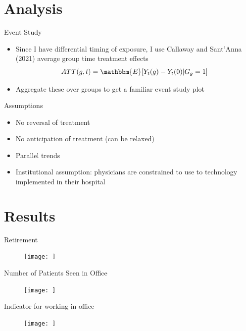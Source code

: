 \documentclass[10pt]{beamer}
\begin{document}
\section{Analysis}


\begin{frame}{Event Study}

\begin{itemize}
    \item Since I have differential timing of exposure, I use Callaway and Sant'Anna (2021) average group time treatment effects
    \vspace{3mm}
    $$ATT(g,t)=\mathbbm{E}[Y_t(g)-Y_t(0)|G_g=1]$$
    \vspace{3mm}
    \item Aggregate these over groups to get a familiar event study plot
\end{itemize}
    
\end{frame}

\begin{frame}{Assumptions}
\begin{itemize}
    \item No reversal of treatment
    \item No anticipation of treatment (can be relaxed)
    \item Parallel trends
    \item Institutional assumption: physicians are constrained to use to technology implemented in their hospital
\end{itemize}
    
\end{frame}

\section{Results}


\begin{frame}{Retirement}
\begin{figure}[ht]
    \centering
    \texttt{[image: ]}
\end{figure}
\end{frame}

\begin{frame}{Number of Patients Seen in Office}
\begin{figure}[ht]
    \centering
    \texttt{[image: ]}
\end{figure}
\end{frame}

\begin{frame}{Indicator for working in office}
\begin{figure}[ht]
    \centering
    \texttt{[image: ]}
\end{figure}
\end{frame}
\end{document}
